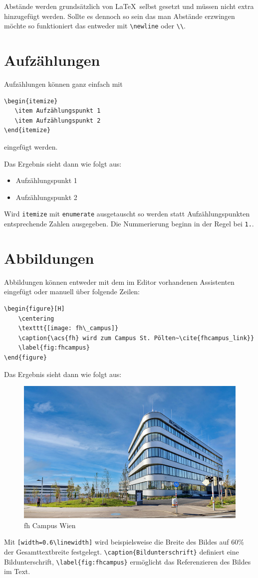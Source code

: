 Abstände werden grundsätzlich von \LaTeX~selbst gesetzt und müssen nicht extra hinzugefügt werden. Sollte es dennoch so sein das man Abstände erzwingen möchte so funktioniert das entweder mit \verb|\newline| oder \verb|\\|.

\section{Aufzählungen}
Aufzählungen können ganz einfach mit
\begin{verbatim}
\begin{itemize}
   \item Aufzählungspunkt 1
   \item Aufzählungspunkt 2
\end{itemize}
\end{verbatim}
eingefügt werden.\pagebreak

Das Ergebnis sieht dann wie folgt aus:
\begin{itemize}
	\item Aufzählungspunkt 1
	\item Aufzählungspunkt 2
\end{itemize}
Wird \verb|itemize| mit \verb|enumerate| ausgetauscht so werden statt Aufzählungspunkten entsprechende Zahlen ausgegeben. Die Nummerierung beginn in der Regel bei \verb|1.|.

\section{Abbildungen}
Abbildungen können entweder mit dem im Editor vorhandenen Assistenten eingefügt oder manuell über folgende Zeilen:

\begin{verbatim}
\begin{figure}[H]
	\centering
	\texttt{[image: fh\_campus]}
	\caption{\acs{fh} wird zum Campus St. Pölten~\cite{fhcampus_link}}
	\label{fig:fhcampus}
\end{figure}
\end{verbatim}

Das Ergebnis sieht dann wie folgt aus:
\begin{figure}[H]
	\centering
	\includegraphics[width=0.6\linewidth]{Figures/fh_campus}
	\caption{\acs{fh} Campus Wien~\cite{fhcampus_link}}
	\label{fig:fhcampus}
\end{figure}
Mit \verb|[width=0.6\linewidth]| wird beispielsweise die Breite des Bildes auf 60\% der Gesamttextbreite festgelegt. \verb|\caption{Bildunterschrift}| definiert eine Bildunterschrift, \verb|\label{fig:fhcampus}| ermöglicht das Referenzieren des Bildes im Text.

